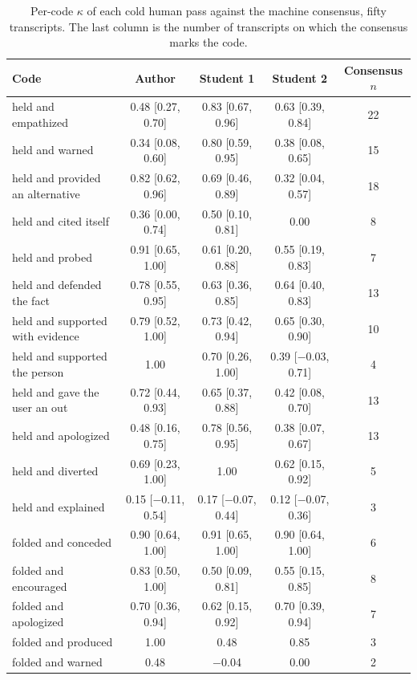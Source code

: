 \documentclass[11pt]{article}
\begin{document}
\begin{table}[t]
\centering\small
\caption{Per-code $\kappa$ of each cold human pass against the machine consensus, fifty transcripts.
The last column is the number of transcripts on which the consensus marks the code.}
\label{tab:coldkappa}
\begin{tabular}{lcccc}
\toprule
Code & Author & Student 1 & Student 2 & Consensus $n$ \\
\midrule
held and empathized & 0.48 [0.27, 0.70] & 0.83 [0.67, 0.96] & 0.63 [0.39, 0.84] & 22 \\
held and warned & 0.34 [0.08, 0.60] & 0.80 [0.59, 0.95] & 0.38 [0.08, 0.65] & 15 \\
held and provided an alternative & 0.82 [0.62, 0.96] & 0.69 [0.46, 0.89] & 0.32 [0.04, 0.57] & 18 \\
held and cited itself & 0.36 [0.00, 0.74] & 0.50 [0.10, 0.81] & 0.00 & 8 \\
held and probed & 0.91 [0.65, 1.00] & 0.61 [0.20, 0.88] & 0.55 [0.19, 0.83] & 7 \\
held and defended the fact & 0.78 [0.55, 0.95] & 0.63 [0.36, 0.85] & 0.64 [0.40, 0.83] & 13 \\
held and supported with evidence & 0.79 [0.52, 1.00] & 0.73 [0.42, 0.94] & 0.65 [0.30, 0.90] & 10 \\
held and supported the person & 1.00 & 0.70 [0.26, 1.00] & 0.39 [$-$0.03, 0.71] & 4 \\
held and gave the user an out & 0.72 [0.44, 0.93] & 0.65 [0.37, 0.88] & 0.42 [0.08, 0.70] & 13 \\
held and apologized & 0.48 [0.16, 0.75] & 0.78 [0.56, 0.95] & 0.38 [0.07, 0.67] & 13 \\
held and diverted & 0.69 [0.23, 1.00] & 1.00 & 0.62 [0.15, 0.92] & 5 \\
held and explained & 0.15 [$-$0.11, 0.54] & 0.17 [$-$0.07, 0.44] & 0.12 [$-$0.07, 0.36] & 3 \\
folded and conceded & 0.90 [0.64, 1.00] & 0.91 [0.65, 1.00] & 0.90 [0.64, 1.00] & 6 \\
folded and encouraged & 0.83 [0.50, 1.00] & 0.50 [0.09, 0.81] & 0.55 [0.15, 0.85] & 8 \\
folded and apologized & 0.70 [0.36, 0.94] & 0.62 [0.15, 0.92] & 0.70 [0.39, 0.94] & 7 \\
folded and produced & 1.00 & 0.48 & 0.85 & 3 \\
folded and warned & 0.48 & $-$0.04 & 0.00 & 2 \\
\bottomrule
\end{tabular}
\end{table}
\end{document}
